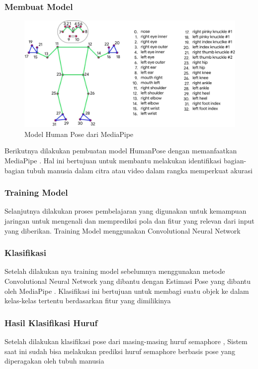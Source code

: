 \subsubsection{Membuat Model}
\begin{figure} [ht] \centering
  \includegraphics[scale=0.3]{gambar/humanpose.jpg}
  \caption{Model Human Pose dari MediaPipe}
  \label{fig:hasil}

\end{figure}
Berikutnya dilakukan pembuatan model HumanPose dengan memanfaatkan MediaPipe . Hal ini bertujuan untuk membantu melakukan identifikasi bagian-bagian tubuh manusia dalam citra atau video dalam rangka memperkuat akurasi 

\subsubsection{Training Model}
Selanjutnya dilakukan proses pembelajaran yang digunakan untuk  kemampuan jaringan untuk mengenali dan memprediksi pola dan fitur yang relevan dari input yang diberikan. Training Model menggunakan Convolutional Neural Network

\subsubsection{Klasifikasi}
Setelah dilakukan nya training model sebelumnya menggunakan metode Convolutional Neural Network yang dibantu dengan Estimasi Pose yang dibantu oleh MediaPipe . Klasifikasi ini bertujuan untuk membagi suatu objek ke dalam kelas-kelas tertentu berdasarkan fitur yang dimilikinya

\subsubsection{Hasil Klasifikasi Huruf}
Setelah dilakukan klasifikasi pose dari masing-masing huruf semaphore , Sistem saat ini sudah bisa melakukan prediksi huruf semaphore berbasis pose yang diperagakan oleh tubuh manusia  


